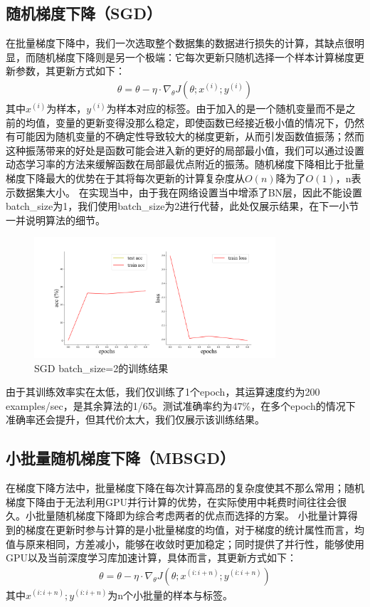 \documentclass[10.5pt,a4paper]{article}%
\begin{document}
        \subsection{随机梯度下降（SGD）}
            在批量梯度下降中，我们一次选取整个数据集的数据进行损失的计算，其缺点很明显，而随机梯度下降则是另一个极端：它每次更新只随机选择一个样本计算梯度更新参数，其更新方式如下：
            \begin{align*}
                \theta=\theta-\eta\cdot\nabla_\theta J(\theta;x^{(i)};y^{(i)})
            \end{align*}
            其中$x^{(i)}$为样本，$y^{(i)}$为样本对应的标签。由于加入的是一个随机变量而不是之前的均值，变量的更新变得没那么稳定，即使函数已经接近极小值的情况下，仍然有可能因为随机变量的不确定性导致较大的梯度更新，从而引发函数值振荡；然而这种振荡带来的好处是函数可能会进入新的更好的局部最小值，我们可以通过设置动态学习率的方法来缓解函数在局部最优点附近的振荡。随机梯度下降相比于批量梯度下降最大的优势在于其将每次更新的计算复杂度从$O(n)$降为了$O(1)$，n表示数据集大小。
            在实现当中，由于我在网络设置当中增添了BN层，因此不能设置batch\_size为1，我们使用batch\_size为2进行代替，此处仅展示结果，在下一小节一并说明算法的细节。
            \begin{figure}[H]
            \centering
                \includegraphics[width=0.8\textwidth]{SGD_batch_2.png}
              \caption{SGD batch\_size=2的训练结果}
              \label{fig:SGD}
            \end{figure}
            由于其训练效率实在太低，我们仅训练了1个epoch，其运算速度约为200 examples/sec，是其余算法的1/65。测试准确率约为47\%，在多个epoch的情况下准确率还会提升，但其代价太大，我们仅展示该训练结果。
        \subsection{小批量随机梯度下降（MBSGD）}
            在梯度下降方法中，批量梯度下降在每次计算高昂的复杂度使其不那么常用；随机梯度下降由于无法利用GPU并行计算的优势，在实际使用中耗费时间往往会很久。小批量随机梯度下降即为综合考虑两者的优点而选择的方案。
            小批量计算得到的梯度在更新时参与计算的是小批量梯度的均值，对于梯度的统计属性而言，均值与原来相同，方差减小，能够在收敛时更加稳定；同时提供了并行性，能够使用GPU以及当前深度学习库加速计算，具体而言，其更新方式如下：
            \begin{align*}
                \theta=\theta-\eta\cdot\nabla_\theta J(\theta;x^{(i:i+n)};y^{(i:i+n)})
            \end{align*}
            其中$x^{(i:i+n)};y^{(i:i+n)}$为n个小批量的样本与标签。
\end{document}
